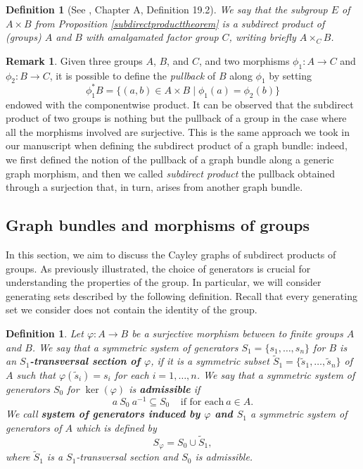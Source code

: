 \documentclass{amsart}
\newtheorem{defn}[theo]{Definition}
\theoremstyle{definition}
\newtheorem{rem}[theo]{Remark}
\numberwithin{equation}{section}
\begin{document}
\begin{defn}[See \cite{dh}, Chapter A, Definition 19.2]\label{subdirgroups}
We say that the subgroup $E$ of $A \times B$ from Proposition \ref{subdirectproducttheorem} is a \textit{subdirect product of (groups) $A$ and $B$ with amalgamated factor group $C$}, writing briefly $A \times_C B$. 
\end{defn}
\begin{rem}
Given three groups $A$, $B$, and $C$, and two morphisms $\phi_1: A \longrightarrow C$ and $\phi_2: B \longrightarrow C$, it is possible to define the \textit{pullback} of $B$ along $\phi_1$ by setting  
\begin{equation}
\phi_1^*B = \{(a,b) \in A \times B \mid \phi_1(a) = \phi_2(b)\}
\end{equation}  
endowed with the componentwise product.  
It can be observed that the subdirect product of two groups is nothing but the pullback of a group in the case where all the morphisms involved are surjective. This is the same approach we took in our manuscript when defining the subdirect product of a graph bundle: indeed, we first defined the notion of the pullback of a graph bundle along a generic graph morphism, and then we called \textit{subdirect product} the pullback obtained through a surjection that, in turn, arises from another graph bundle.
\end{rem}
\subsection{Graph bundles and morphisms of groups}
In this section, we aim to discuss the Cayley graphs of subdirect products of groups. As previously illustrated, the choice of generators is crucial for understanding the properties of the group. In particular, we will consider generating sets described by the following definition. Recall that every generating set we consider does not contain the identity of the group.

\begin{defn}\label{crosssectionadapted}
Let $\varphi: A \longrightarrow B$ be a surjective morphism between to finite groups $A$ and $B$. We say that a symmetric system of generators $S_1=\{s_1, \dots, s_n\}$   for $B$ is an $S_1$\textbf{-transversal section of $\varphi$}, if it is a symmetric subset $\widetilde{S}_1=\{\widetilde{s}_1, \dots, \widetilde{s}_n\}$ of $A$ such that $\varphi(\widetilde{s}_i) = s_i$ for each $i=1, \dots, n$.  We say that a symmetric system of generators $S_0$ for $\ker(\varphi)$ is \textbf{admissible} if
\begin{equation}
a \ S_0 \ a^{-1} \subseteq S_0 \ \ \ \ \  \mbox{if for each}  \ a \in A.
\end{equation}
We call \textbf{system of generators induced by  $\varphi$ and $S_1$}  a symmetric system of generators of $A$ which is defined by
\begin{equation}
    S_{\varphi} = S_0 \cup \widetilde{S}_1,
\end{equation}
where $\widetilde{S}_1$ is a $S_1$-transversal section and $S_0$ is admissible.
\end{defn}
\end{document}
